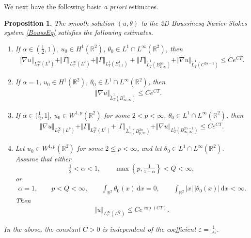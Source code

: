 \documentclass[reqno,11pt,a4paper]{amsart}
\newtheorem{proposition}[theorem]{Proposition}
\newcommand{\dd}{\mathrm{d}}
\begin{document}
We next have the following basic \textit{{\it{a priori}}} estimates.
\begin{proposition}\label{prop:ap-es-basic}
  The smooth solution $(u,\theta)$ to the 2D Boussinesq-Navier-Stokes system \eqref{BoussEq} satisfies the following estimates.
\begin{enumerate}[(1)]
\item
If $\alpha\in(\frac{1}{2},1),\,u_0\in H^1(\mathbb{R}^2)$, $\theta_0\in L^1\cap L^\infty(\mathbb{R}^2)$, then 
\begin{align}\label{eq:u-Gam-es2}
  \Vert \nabla u\Vert _{L^\infty_T(L^2)} +  \Vert \Gamma\Vert _{L^\infty_T(L^2)}+ \Vert \Gamma\Vert _{L^1_T(B^1_{2,1})}
  + \left\Vert \Gamma\right\Vert _{\widetilde{L}_T^1 (B_{2, \infty}^{2\alpha})}
  + \Vert \nabla u\Vert _{\widetilde{L}^1_T(C^{2\alpha-1})} 
  \leq C e^{C T} .
\end{align}
\item 
If $\alpha=1,\,u_0\in H^1(\mathbb{R}^2)$, $\theta_0\in L^1\cap L^\infty(\mathbb{R}^2)$, then 
\begin{align}\label{es:nabu-Gam2-2b}
  \Vert \nabla u\Vert _{\widetilde{L}^1_T( B^1_{\infty,\infty})} \leq C e^{CT}. \quad   
\end{align}
\item
 If $\alpha\in(\frac{1}{2},1]$, $u_0\in W^{1,p}(\mathbb{R}^2)$ for some $2<p<\infty$,  
$\theta_0\in L^1\cap L^\infty(\mathbb{R}^2)$, 
then
\begin{align}\label{es:nabu-Gam2}
  \Vert \nabla u\Vert _{L^\infty_T(L^p)}+\Vert \Gamma\Vert _{L^\infty_T(L^p)}
  + \Vert \Gamma\Vert _{\widetilde{L}^1_T(B^{2\alpha}_{p,\infty})}
  +  \Vert \nabla u\Vert _{L^1_T(B^{2\alpha-1}_{\infty,\infty})}
  \leq C e^{CT} .
\end{align}
\item
Let $u_0\in W^{1,p}(\mathbb R^2)$ for some
$2\leq p<\infty$, and let
$\theta_0\in L^1\cap L^\infty(\mathbb R^2)$.
Assume that either
\[
  \tfrac12<\alpha<1,
  \qquad
  \max\left\{p,\tfrac1{1-\alpha}\right\}<Q<\infty,
\]
or
\[
  \begin{gathered}
    \alpha=1,\qquad p<Q<\infty,\qquad
    \int_{\mathbb R^2}\theta_0(x)\,\dd x=0,
    \qquad
    \int_{\mathbb R^2}|x|\,|\theta_0(x)|\,\dd x<\infty.
  \end{gathered}
\]
Then
\begin{equation}\label{eq:u-LQ-es}
  \Vert u\Vert _{L^\infty_T(L^Q)}
  \leq Ce^{\exp(CT)}.
\end{equation}
\end{enumerate}
In the above, the constant $C>0$ is independent of the coefficient $\varepsilon=\frac{1}{\mathrm{Pr}}$.
\end{proposition}
\end{document}

